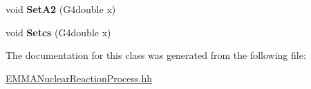 \begin{DoxyCompactItemize}
\item 
\hypertarget{classEMMANuclearReactionProcess_ab63302297eb8193ac523c0651ccd1344}{void {\bfseries Set\-A2} (G4double x)}\label{classEMMANuclearReactionProcess_ab63302297eb8193ac523c0651ccd1344}

\item 
\hypertarget{classEMMANuclearReactionProcess_aef727862352458b11abd2b0c4a5f33cb}{void {\bfseries Setcs} (G4double x)}\label{classEMMANuclearReactionProcess_aef727862352458b11abd2b0c4a5f33cb}

\end{DoxyCompactItemize}


The documentation for this class was generated from the following file\-:\begin{DoxyCompactItemize}
\item 
\hyperlink{EMMANuclearReactionProcess_8hh}{E\-M\-M\-A\-Nuclear\-Reaction\-Process.\-hh}\end{DoxyCompactItemize}
